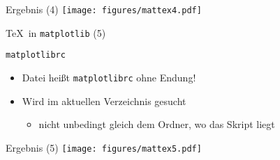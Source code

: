 \AddToShipoutPictureFG*{\ShowFramePicture}
\begin{frame}{Ergebnis (4)}
  \centering
  \texttt{[image: figures/mattex4.pdf]}
\end{frame}

\begin{frame}[fragile]{\TeX\ in \texttt{matplotlib} (5)}
\end{frame}

\begin{frame}[fragile]{\texttt{matplotlibrc}}
  \lstMatplotlibrcSettings
  

  \begin{itemize}
    \item Datei heißt \texttt{matplotlibrc} ohne Endung!
    \item Wird im aktuellen Verzeichnis gesucht
      \begin{itemize}
        \item nicht unbedingt gleich dem Ordner, wo das Skript liegt
      \end{itemize}
  \end{itemize}
\end{frame}

\AddToShipoutPictureFG*{\ShowFramePicture}
\begin{frame}{Ergebnis (5)}
  \centering
  \texttt{[image: figures/mattex5.pdf]}
\end{frame}

